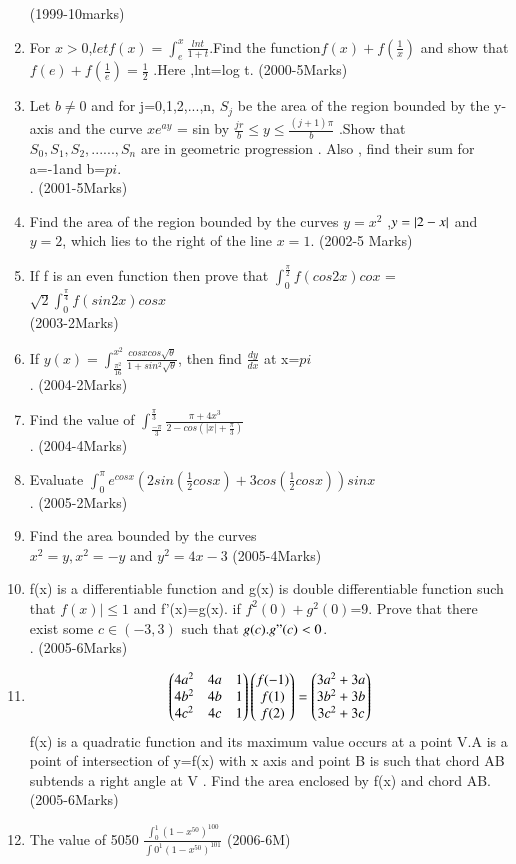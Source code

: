 \documentclass[journal,12pt,twocolumn]{IEEEtran}
\theoremstyle{remark}
\begin{document}
\begin{enumerate}
\hfill{(1999-10marks)}\\
\item For $x > 0 $,$let f(x)=\int_{e}^{x}\frac{lnt}{1+t}$.Find the function$ f(x) + f(\frac{1}{x})$
and show that $f(e)+f(\frac{1}{e})=
\frac{1}{2}$ .Here ,lnt=log t.
\hfill{(2000-5Marks)}
\item Let $b\neq0$ and for j=0,1,2,...,n, $S_j$ be the area of the region bounded by the y-axis and the curve $xe^{ay}$ = sin by $\frac{jr}{b} \le y \le \frac{(j+1)\pi}{b}$ .Show that  $S_0,S_1,S_2,......,S_n$ are in geometric progression . Also , find their sum for a=-1and b=$pi$.\\.
\hfill{(2001-5Marks)}
\item Find the area of the region bounded by the curves $y=x^2$ ,$y=\left\vert2-x\right\vert$ and $y=2$, which lies to the right of the line $x=1$.
\hfill{(2002-5 Marks)}
\item If f is an even function then prove that 	$\int_{0}^{\frac{\pi}{2}}f(cos2x)cox $ =$\sqrt{2}\int_{0}^{\frac{\pi}{4}}f(sin2x)cosx$\\						
\hfill{(2003-2Marks)}
\item If $y(x)=\int_{\frac{\pi^2}{16}}^{x^2}\frac{cosxcos\sqrt{\theta}}{1+sin^2\sqrt{\theta}}$, then find $\frac{dy}{dx}$ at x=$pi$\\.
\hfill{(2004-2Marks)}
\item  Find the value of $\int_{\frac{-\pi}{3}}^{\frac{\pi}{3}}\frac{\pi+4x^3}{2-cos(|x|+\frac{\pi}{3})}$\\.
\hfill{(2004-4Marks)}
\item Evaluate $\int_{0}^{\pi}e^{cosx}(2sin(\frac{1}{2}cosx)+3cos(\frac{1}{2}cosx))sinx$\\.
\hfill{(2005-2Marks)}
\item Find the area bounded by the curves \\  
$x^2=y,x^2=-y$ and $y^2=4x-3$
\hfill{(2005-4Marks)}
\item  f(x) is a differentiable function and g(x) is  double differentiable function such that $f(x)|\le1$ and f'(x)=g(x). if $f^2(0)+g^2(0)$=9. Prove that there exist some $c\in(-3,3)$ such that $g(c).g"(c)<0$.\\.
\hfill{(2005-6Marks)}
\item 
  \[
\begin{pmatrix}4a^2 & 4a & 1\\4b^2 & 4b & 1\\4c^2 & 4c & 1\end{pmatrix}
\begin{pmatrix}f(-1)\\f(1)\\f(2)\end{pmatrix} =
\begin{pmatrix}3a^2+3a\\3b^2+3b\\3c^2+3c\end{pmatrix}
\]
f(x) is a quadratic function and its maximum value occurs at a point V.A is a point of intersection of y=f(x) with x axis and point B is such that chord AB subtends a right angle at V . Find the area enclosed by f(x) and chord AB.
\hfill{(2005-6Marks)}
\item The value of 5050 $\frac{\int_{0}^{1}(1-x^50)^100}{\int{0}^{1} {(1-x^50)^101}}$
\hfill{(2006-6M)}


\end{enumerate}
\end{document}
